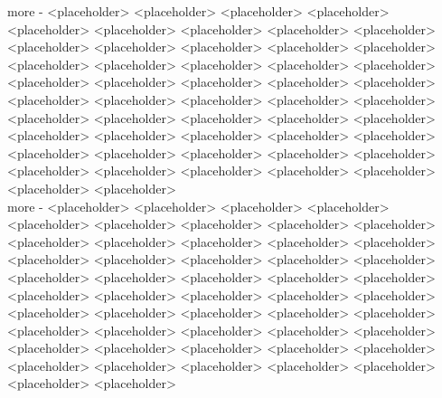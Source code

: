 \documentclass[11pt,wide]{mwart}
\begin{document}
\begin{minipage}{0.45\textwidth}
  {\emph \large more} - <placeholder> <placeholder> <placeholder> <placeholder> <placeholder> <placeholder> <placeholder> <placeholder> <placeholder> <placeholder> <placeholder> <placeholder> <placeholder> <placeholder> <placeholder> <placeholder> <placeholder> <placeholder> <placeholder> <placeholder> <placeholder> <placeholder> <placeholder> <placeholder> <placeholder> <placeholder> <placeholder> <placeholder> <placeholder> <placeholder> <placeholder> <placeholder> <placeholder> <placeholder> <placeholder> <placeholder> <placeholder> <placeholder> <placeholder> <placeholder> <placeholder> <placeholder> <placeholder> <placeholder> <placeholder> <placeholder> <placeholder> <placeholder> <placeholder> <placeholder> <placeholder> \\
  {\emph \large more} - <placeholder> <placeholder> <placeholder> <placeholder> <placeholder> <placeholder> <placeholder> <placeholder> <placeholder> <placeholder> <placeholder> <placeholder> <placeholder> <placeholder> <placeholder> <placeholder> <placeholder> <placeholder> <placeholder> <placeholder> <placeholder> <placeholder> <placeholder> <placeholder> <placeholder> <placeholder> <placeholder> <placeholder> <placeholder> <placeholder> <placeholder> <placeholder> <placeholder> <placeholder> <placeholder> <placeholder> <placeholder> <placeholder> <placeholder> <placeholder> <placeholder> <placeholder> <placeholder> <placeholder> <placeholder> <placeholder> <placeholder> <placeholder> <placeholder> <placeholder> <placeholder> \\
\end{minipage}
\end{document}
